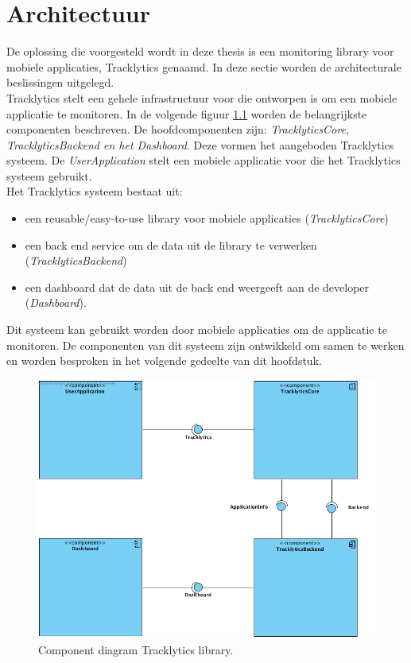 \chapter{Architectuur}\label{architectuur}
De oplossing die voorgesteld wordt in deze thesis is een monitoring library voor mobiele applicaties, Tracklytics genaamd. In deze sectie worden de architecturale beslissingen uitgelegd.\\

Tracklytics stelt een gehele infrastructuur voor die ontworpen is om een mobiele applicatie te monitoren. In de volgende figuur \ref{fig:component} worden de belangrijkste componenten beschreven. De hoofdcomponenten zijn: \textit{TracklyticsCore, TracklyticsBackend en het Dashboard}. Deze vormen het aangeboden Tracklytics systeem. De \textit{UserApplication} stelt een mobiele applicatie voor die het Tracklytics systeem gebruikt. \\

Het Tracklytics systeem bestaat uit:
\begin{itemize}
\item een reusable/easy-to-use library voor mobiele applicaties (\textit{TracklyticsCore})
\item een back end service om de data uit de library te verwerken (\textit{TracklyticsBackend})
\item een dashboard dat de data uit de back end weergeeft aan de developer (\textit{Dashboard}).
\end{itemize}

Dit systeem kan gebruikt worden door mobiele applicaties om de applicatie te monitoren. De componenten van dit systeem zijn ontwikkeld om samen te werken en worden besproken in het volgende gedeelte van dit hoofdstuk. 


\begin{figure}[!h]
  \centering
  \includegraphics[scale=0.4]{Afbeeldingen/Architectuur/Component}
  \caption{Component diagram Tracklytics library.}
  \label{fig:component}
\end{figure}

